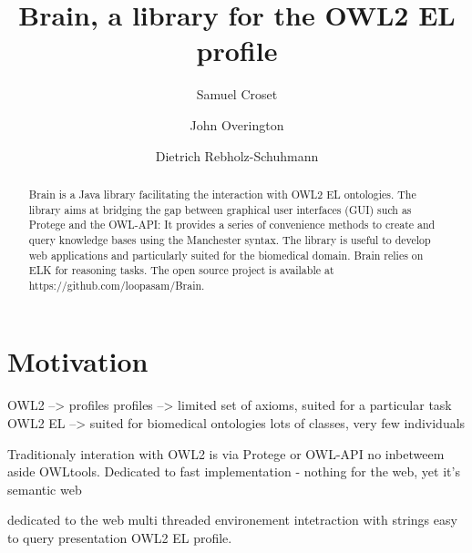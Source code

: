\documentclass{llncs}
\begin{document}
%
\frontmatter          %
%
\pagestyle{headings}  %

\mainmatter              %
%
\title{Brain, a library for the OWL2 EL profile}
%
%
\author{Samuel Croset \and John Overington \and Dietrich Rebholz-Schuhmann}

\maketitle              %

\begin{abstract}
Brain is a Java library facilitating the interaction with OWL2 EL ontologies. 
The library aims at bridging the gap between graphical user interfaces (GUI) such as Protege and the OWL-API: It provides 
a series of convenience methods to create and query knowledge bases using the Manchester syntax. 
The library is useful to develop web applications and particularly suited for the biomedical domain. 
Brain relies on ELK for reasoning tasks. The open source project is available at https://github.com/loopasam/Brain.

\end{abstract}

\section{Motivation}

OWL2 --> profiles
profiles --> limited set of axioms, suited for a particular task
OWL2 EL --> suited for biomedical ontologies
lots of classes, very few individuals

Traditionaly interation with OWL2 is via Protege or OWL-API
no inbetweem aside OWLtools. Dedicated to fast implementation
- nothing for the web, yet it's semantic web




dedicated to the web
multi threaded environement
intetraction with strings
easy to query
presentation OWL2 EL profile.
\end{document}

